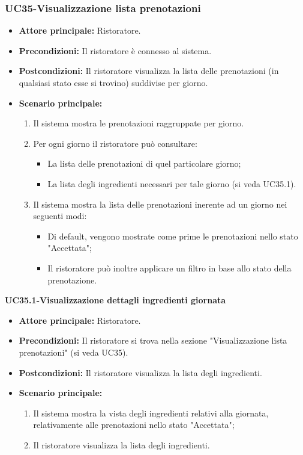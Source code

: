 \subsubsection{UC35-Visualizzazione lista prenotazioni}
\begin{itemize}
\item \textbf{Attore principale:} Ristoratore.
\item \textbf{Precondizioni:} Il ristoratore è connesso al sistema.
\item \textbf{Postcondizioni:} Il ristoratore visualizza la lista delle prenotazioni (in qualsiasi stato esse si trovino) suddivise per giorno.
\item \textbf{Scenario principale:}
\begin{enumerate}
    \item Il sistema mostra le prenotazioni raggruppate per giorno.
    \item Per ogni giorno il ristoratore può consultare:
    \begin{itemize}
        \item La lista delle prenotazioni di quel particolare giorno;
        \item La lista degli ingredienti necessari per tale giorno (si veda UC35.1).
    \end{itemize}
    \item Il sistema mostra la lista delle prenotazioni inerente ad un giorno nei seguenti modi:
    \begin{itemize}
        \item Di default, vengono mostrate come prime le prenotazioni nello stato "Accettata";
        \item Il ristoratore può inoltre applicare un filtro in base allo stato della prenotazione.
    \end{itemize}
\end{enumerate}
\end{itemize}

\textbf{UC35.1-Visualizzazione dettagli ingredienti giornata}
\begin{itemize}
\item \textbf{Attore principale:} Ristoratore.
\item \textbf{Precondizioni:} Il ristoratore si trova nella sezione "Visualizzazione lista prenotazioni" (si veda UC35).
\item \textbf{Postcondizioni:} Il ristoratore visualizza la lista degli ingredienti.
\item \textbf{Scenario principale:}
\begin{enumerate}
    \item Il sistema mostra la vista degli ingredienti relativi alla giornata, relativamente alle prenotazioni nello stato "Accettata";
    \item Il ristoratore visualizza la lista degli ingredienti.
\end{enumerate}
\end{itemize}

